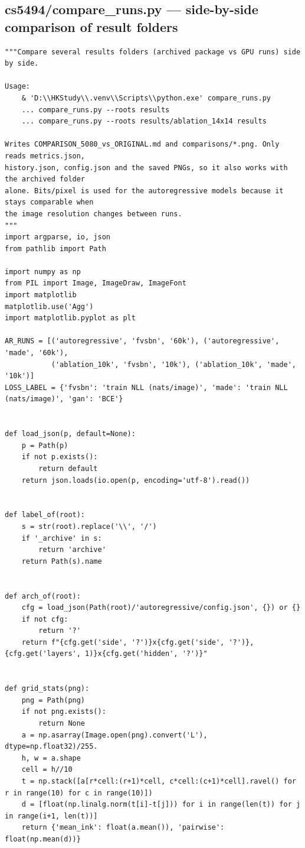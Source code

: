 \subsection*{cs5494/compare\_runs.py --- side-by-side comparison of result folders}
\begin{lstlisting}
"""Compare several results folders (archived package vs GPU runs) side by side.

Usage:
    & 'D:\\HKStudy\\.venv\\Scripts\\python.exe' compare_runs.py
    ... compare_runs.py --roots results
    ... compare_runs.py --roots results/ablation_14x14 results

Writes COMPARISON_5080_vs_ORIGINAL.md and comparisons/*.png. Only reads metrics.json,
history.json, config.json and the saved PNGs, so it also works with the archived folder
alone. Bits/pixel is used for the autoregressive models because it stays comparable when
the image resolution changes between runs.
"""
import argparse, io, json
from pathlib import Path

import numpy as np
from PIL import Image, ImageDraw, ImageFont
import matplotlib
matplotlib.use('Agg')
import matplotlib.pyplot as plt

AR_RUNS = [('autoregressive', 'fvsbn', '60k'), ('autoregressive', 'made', '60k'),
           ('ablation_10k', 'fvsbn', '10k'), ('ablation_10k', 'made', '10k')]
LOSS_LABEL = {'fvsbn': 'train NLL (nats/image)', 'made': 'train NLL (nats/image)', 'gan': 'BCE'}


def load_json(p, default=None):
    p = Path(p)
    if not p.exists():
        return default
    return json.loads(io.open(p, encoding='utf-8').read())


def label_of(root):
    s = str(root).replace('\\', '/')
    if '_archive' in s:
        return 'archive'
    return Path(s).name


def arch_of(root):
    cfg = load_json(Path(root)/'autoregressive/config.json', {}) or {}
    if not cfg:
        return '?'
    return f"{cfg.get('side', '?')}x{cfg.get('side', '?')}, {cfg.get('layers', 1)}x{cfg.get('hidden', '?')}"


def grid_stats(png):
    png = Path(png)
    if not png.exists():
        return None
    a = np.asarray(Image.open(png).convert('L'), dtype=np.float32)/255.
    h, w = a.shape
    cell = h//10
    t = np.stack([a[r*cell:(r+1)*cell, c*cell:(c+1)*cell].ravel() for r in range(10) for c in range(10)])
    d = [float(np.linalg.norm(t[i]-t[j])) for i in range(len(t)) for j in range(i+1, len(t))]
    return {'mean_ink': float(a.mean()), 'pairwise': float(np.mean(d))}



\end{lstlisting}
